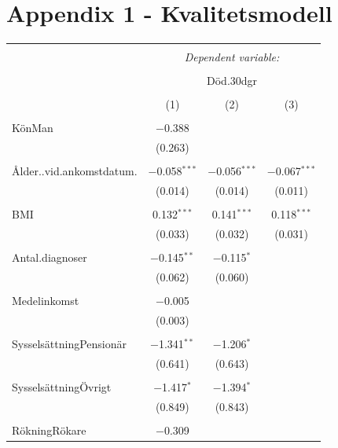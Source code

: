 {

\section{Appendix 1 - Kvalitetsmodell}

\begin{table}[!htbp] \centering 
\begin{tabular}{@{\extracolsep{5pt}}lccc} 
\\[-1.8ex]\hline 
\hline \\[-1.8ex] 
 & \multicolumn{3}{c}{\textit{Dependent variable:}} \\ 
\cline{2-4} 
\\[-1.8ex] & \multicolumn{3}{c}{Död.30dgr} \\ 
\\[-1.8ex] & (1) & (2) & (3)\\ 
\hline \\[-1.8ex] 
 KönMan & $-$0.388 &  &  \\ 
  & (0.263) &  &  \\ 
  & & & \\ 
 Ålder..vid.ankomstdatum. & $-$0.058$^{***}$ & $-$0.056$^{***}$ & $-$0.067$^{***}$ \\ 
  & (0.014) & (0.014) & (0.011) \\ 
  & & & \\ 
 BMI & 0.132$^{***}$ & 0.141$^{***}$ & 0.118$^{***}$ \\ 
  & (0.033) & (0.032) & (0.031) \\ 
  & & & \\ 
 Antal.diagnoser & $-$0.145$^{**}$ & $-$0.115$^{*}$ &  \\ 
  & (0.062) & (0.060) &  \\ 
  & & & \\ 
 Medelinkomst & $-$0.005 &  &  \\ 
  & (0.003) &  &  \\ 
  & & & \\ 
 SysselsättningPensionär & $-$1.341$^{**}$ & $-$1.206$^{*}$ &  \\ 
  & (0.641) & (0.643) &  \\ 
  & & & \\ 
 SysselsättningÖvrigt & $-$1.417$^{*}$ & $-$1.394$^{*}$ &  \\ 
  & (0.849) & (0.843) &  \\ 
  & & & \\ 
 RökningRökare & $-$0.309 &  &  \\ 

\end{tabular}
\end{table}}
